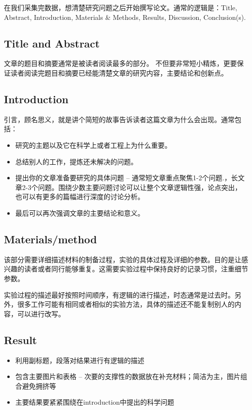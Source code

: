 \documentclass[onecolumn,oneside]{BUPTHomework}
\begin{document}
  在我们采集完数据，想清楚研究问题之后开始撰写论文。通常的逻辑是：Title, Abstract, Introduction, Materials \& Methods, Results, Discussion, Conclusion(s). 

  \subsection*{Title and Abstract}

  文章的题目和摘要通常是被读者阅读最多的部分。 不但要非常短小精炼，更要保证读者阅读完题目和摘要已经能清楚文章的研究内容，主要结论和创新点。

  \subsection*{Introduction}

  引言，顾名思义，就是讲个简短的故事告诉读者这篇文章为什么会出现。通常包括：

  \begin{itemize}
    \item 研究的主题以及它在科学上或者工程上为什么重要。
    \item 总结别人的工作，提炼还未解决的问题。
    \item 提出你的文章准备要研究的具体问题 – 通常短文章重点聚焦1-2个问题.，长文章2-3个问题。围绕少数主要问题讨论可以让整个文章逻辑性强，论点突出，也可以有更多的篇幅进行深度的讨论分析。
    \item 最后可以再次强调文章的主要结论和意义。
  \end{itemize}

  \subsection*{Materials/method}

  该部分需要详细描述材料的制备过程，实验的具体过程及详细的参数。目的是让感兴趣的读者或者同行能够重复。这需要实验过程中保持良好的记录习惯，注重细节参数。

  实验过程的描述最好按照时间顺序，有逻辑的进行描述，时态通常是过去时。另外，很多工作可能有相同或者相似的实验方法，具体的描述还不能复制别人的内容，可以进行改写。

  \subsection*{Result}

  \begin{itemize}
    \item  利用副标题，段落对结果进行有逻辑的描述
    \item 包含主要图片和表格 – 次要的支撑性的数据放在补充材料；简洁为主，图片组合避免拥挤等
    \item 主要结果要紧紧围绕在introduction中提出的科学问题
  \end{itemize}
\end{document}
